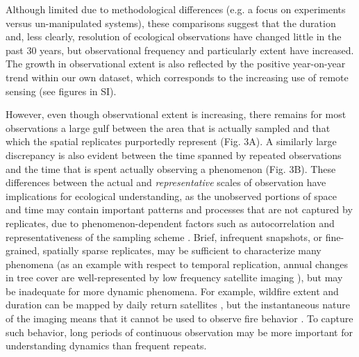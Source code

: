 \documentclass[12pt]{article}
\begin{document}
Although limited due to methodological differences (e.g. a focus on experiments versus un-manipulated systems), these comparisons suggest that the duration and, less clearly, resolution of ecological observations have changed little in the past 30 years, but observational frequency and particularly extent have increased. The growth in observational extent is also reflected by the positive year-on-year trend within our own dataset, which corresponds to the increasing use of remote sensing (see figures in SI).  

However, even though observational extent is increasing, there remains for most observations a large gulf between the area that is actually sampled and that which the spatial replicates purportedly represent (Fig. 3A). A similarly large discrepancy is also evident between the time spanned by repeated observations and the time that is spent actually observing a phenomenon (Fig. 3B). These differences between the actual and \emph{representative} scales of observation have implications for ecological understanding, as the unobserved portions of space and time may contain important patterns and processes that are not captured by replicates, due to phenomenon-dependent factors such as autocorrelation and representativeness of the sampling scheme \cite{underwood_experiments_1997,palmer_scale_1994, cao_comparison_2002, legendre_spatial_1993,collins_method_2000}. Brief, infrequent snapshots, or fine-grained, spatially sparse replicates, may be sufficient to characterize many phenomena (as an example with respect to temporal replication, annual changes in tree cover are well-represented by low frequency satellite imaging \cite{hansen_high-resolution_2013}), but may be inadequate for more dynamic phenomena. For example, wildfire extent and duration can be mapped by daily return satellites \cite{roy_prototyping_2005,jones_fire_2009}, but the instantaneous nature of the imaging means that it cannot be used to observe fire behavior \cite{clements_observing_2007}. To capture such behavior, long periods of continuous observation may be more important for understanding dynamics than frequent repeats. 
\end{document}
